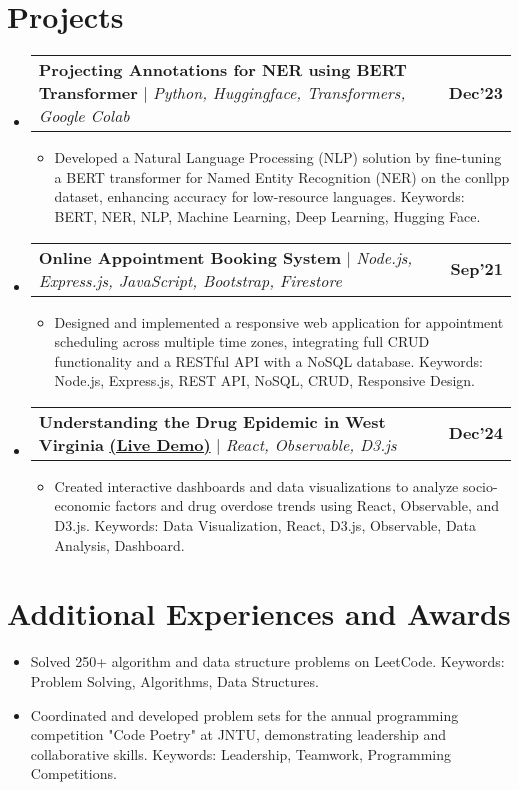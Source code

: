 \documentclass[letterpaper,10.5pt]{article}
\makeatletter
\newcommand{\resumeItem}[1]{%
  \item\small{#1}
}
\newcommand{\resumeProjectHeading}[2]{%
  \item
  \begin{tabular*}{1.001\textwidth}{l@{\extracolsep{\fill}}r}
    \small #1 & \textbf{\small #2} \\
  \end{tabular*}
}
\newcommand{\resumeSubHeadingListStart}{\begin{itemize}[leftmargin=0.0in, label={}]}
\newcommand{\resumeSubHeadingListEnd}{\end{itemize}}
\newcommand{\resumeItemListStart}{\begin{itemize}}
\newcommand{\resumeItemListEnd}{\end{itemize}}
\makeatother
\begin{document}
\section{Projects}
\resumeSubHeadingListStart
\resumeProjectHeading
          {\textbf{Projecting Annotations for NER using BERT Transformer} $|$ \emph{Python, Huggingface, Transformers, Google Colab}}{Dec'23}
          \resumeItemListStart
              \resumeItem{Developed a Natural Language Processing (NLP) solution by fine-tuning a BERT transformer for Named Entity Recognition (NER) on the conllpp dataset, enhancing accuracy for low-resource languages. Keywords: BERT, NER, NLP, Machine Learning, Deep Learning, Hugging Face.}
          \resumeItemListEnd
\resumeProjectHeading
          {\textbf{Online Appointment Booking System} $|$ \emph{Node.js, Express.js, JavaScript, Bootstrap, Firestore}}{Sep'21}
          \resumeItemListStart
              \resumeItem{Designed and implemented a responsive web application for appointment scheduling across multiple time zones, integrating full CRUD functionality and a RESTful API with a NoSQL database. Keywords: Node.js, Express.js, REST API, NoSQL, CRUD, Responsive Design.}
          \resumeItemListEnd
\resumeProjectHeading
          {\textbf{Understanding the Drug Epidemic in West Virginia} \textbf{\href{https://sidhu-sidhartha.observablehq.cloud/test}{(Live Demo)}} $|$ \emph{React, Observable, D3.js}}{Dec'24}
          \resumeItemListStart
              \resumeItem{Created interactive dashboards and data visualizations to analyze socio-economic factors and drug overdose trends using React, Observable, and D3.js. Keywords: Data Visualization, React, D3.js, Observable, Data Analysis, Dashboard.}
          \resumeItemListEnd
\resumeSubHeadingListEnd
\section{Additional Experiences and Awards}
\resumeSubHeadingListStart
\resumeItemListStart
\resumeItem{Solved 250+ algorithm and data structure problems on LeetCode. Keywords: Problem Solving, Algorithms, Data Structures.}
\resumeItem{Coordinated and developed problem sets for the annual programming competition "Code Poetry" at JNTU, demonstrating leadership and collaborative skills. Keywords: Leadership, Teamwork, Programming Competitions.}
\resumeItemListEnd
\resumeSubHeadingListEnd
\end{document}
